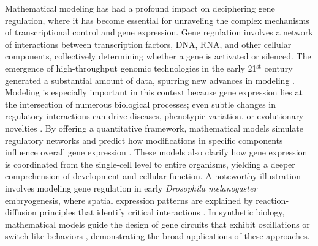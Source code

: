 Mathematical modeling has had a profound impact on deciphering gene regulation, where it has become essential for unraveling the complex mechanisms of transcriptional control and gene expression. Gene regulation involves a network of interactions between transcription factors, DNA, RNA, and other cellular components, collectively determining whether a gene is activated or silenced. The emergence of high-throughput genomic technologies in the early 21$^\text{st}$ century generated a substantial amount of data, spurring new advances in modeling \cite{ay2011mathematical}. Modeling is especially important in this context because gene expression lies at the intersection of numerous biological processes; even subtle changes in regulatory interactions can drive diseases, phenotypic variation, or evolutionary novelties \cite{ay2011mathematical}. By offering a quantitative framework, mathematical models simulate regulatory networks and predict how modifications in specific components influence overall gene expression \cite{banwarth-kuhn2020how}. These models also clarify how gene expression is coordinated from the single-cell level to entire organisms, yielding a deeper comprehension of development and cellular function. A noteworthy illustration involves modeling gene regulation in early \textit{Drosophila melanogaster} embryogenesis, where spatial expression patterns are explained by reaction-diffusion principles that identify critical interactions \cite{reinitz-sharp1995mechanism, jaeger-surkova2004dynamicControl, jaeger-surkova2004dynamicAnalysis}. In synthetic biology, mathematical models guide the design of gene circuits that exhibit oscillations \cite{elowitz2000synthetic} or switch-like behaviors \cite{gardner-cantor2000}, demonstrating the broad applications of these approaches.


